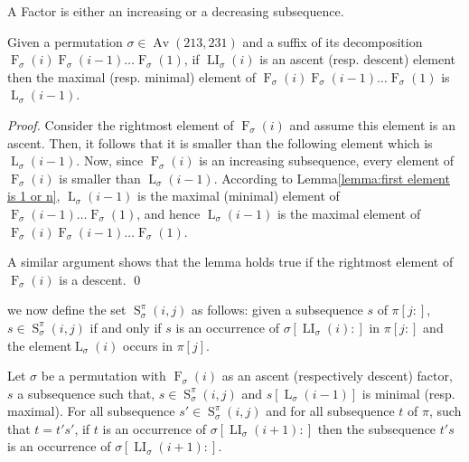 \documentclass[a4paper]{llncs}
\DeclareMathOperator{\AV}{Av}
\newcommand{\ptext}{\pi}
\newcommand{\pmotif}{\sigma}
\DeclareMathOperator{\firsta}{L}
\newcommand{\first}[2]{\firsta_{{#1}}({#2})}
\DeclareMathOperator{\firstia}{LI}
\newcommand{\firsti}[2]{\firstia_{{#1}}({#2})}
\DeclareMathOperator{\factora}{F}
\newcommand{\factor}[2]{\factora_{{#1}}({#2})}
\DeclareMathOperator{\SETa}{S}
\newcommand{\SET}[4]{\SETa_{{#1}}^{{#2}}({#3},{#4})}
\begin{document}
\begin{remark}
A Factor is either an increasing or a decreasing subsequence.
\end{remark}

\begin{lemma}
\label{lemma:whereIsMax}
Given a permutation $\sigma \in \AV(213,231)$ and a suffix of its 
decomposition $\factor{\sigma}{i}\factor{\sigma}{i-1}\ldots\factor{\sigma}{1}$, 
if $\firsti{\sigma}{i}$ is an ascent (resp. descent) element then the maximal 
(resp. minimal) element of $\factor{\sigma}{i}\factor{\sigma}{i-1}\ldots\factor{\sigma}{1}$ is 
$\first{\sigma}{i-1}$.
\end{lemma}

\begin{proof}
Consider the rightmost element of $\factor{\sigma}{i}$ and assume this element is an ascent.
Then, it follows that it is smaller than the following element which is $\first{\sigma}{i-1}$.
Now, since $\factor{\sigma}{i}$ is an increasing subsequence, every element of
$\factor{\sigma}{i}$ is smaller than $\first{\sigma}{i-1}$.
According to Lemma\ref{lemma:first element is 1 or n}, $\first{\sigma}{i-1}$ is the maximal (minimal) element of $\factor{\sigma}{i-1}\ldots\factor{\sigma}{1}$, and hence
$\first{\sigma}{i-1}$ is the maximal  element of
$\factor{\sigma}{i}\factor{\sigma}{i-1}\ldots\factor{\sigma}{1}$.

A similar argument shows that the lemma holds true if the rightmost element
of $\factor{\sigma}{i}$ is a descent.
\qed
\end{proof}

we now define the set
$\SET{\pmotif}{\ptext}{i}{j}$ as follows:
given a subsequence $s$ of $\ptext[j:]$,
$s \in \SET{\pmotif}{\ptext}{i}{j}$ if and only if
$s$ is an occurrence of $\pmotif[\firsti{\pmotif}{i}:]$ in $\ptext[j:]$
and the element$\first{\pmotif}{i}$ occurs in $\ptext[j]$.

\begin{lemma}
Let $\pmotif$ be a permutation 
with $\factor{\pmotif}{i}$ as an ascent (respectively descent) factor,
$s$ a subsequence such that, $s \in \SET{\pmotif}{\ptext}{i}{j}$ and $s[\first{\pmotif}{i-1}]$ is minimal (resp. maximal). 
For all subsequence 
$s' \in \SET{\pmotif}{\ptext}{i}{j}$ and for all subsequence $t$ of $\ptext$, such that $t=t's'$, if $t$ is an occurrence of $\pmotif[\firsti{\pmotif}{i+1}:]$ then the subsequence $t's$ is an occurrence of $\pmotif[\firsti{\pmotif}{i+1}:]$.
\end{lemma}
\end{document}
